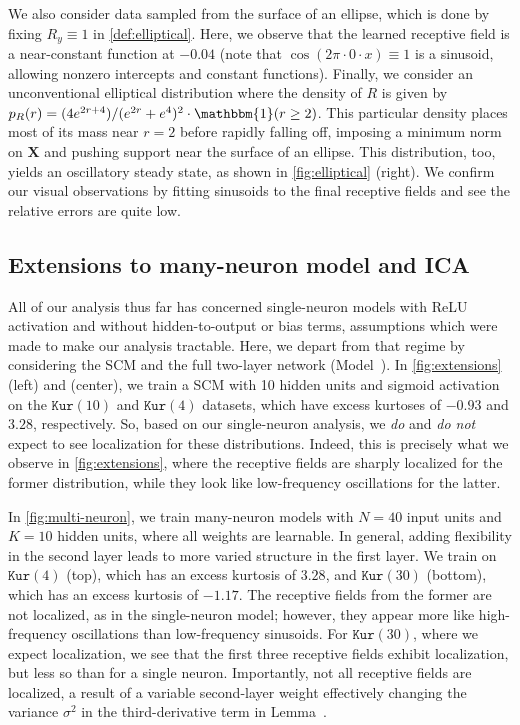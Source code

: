 We also consider data sampled from the surface of an ellipse, which is done by fixing $R_y \equiv 1$ in \cref{def:elliptical}.
Here, we observe that the learned receptive field is a near-constant function at $-0.04$ (note that $\cos(2\pi \cdot 0 \cdot x) \equiv 1$ is a sinusoid, allowing nonzero intercepts and constant functions).
Finally, we consider an unconventional elliptical distribution where the density of $R$ is given by
$p_R(r) = (4e^{2r+4}) / (e^{2r}+e^{4})^{2} \cdot \mathbbm{1}(r \geq 2)$.
This particular density places most of its mass near $r = 2$ before rapidly falling off, imposing a minimum norm on $\mathbf{X}$ and pushing support near the surface of an ellipse.
This distribution, too, yields an oscillatory steady state, as shown in \cref{fig:elliptical} (right). 
We confirm our visual observations by fitting sinusoids to the final receptive fields and see the relative errors are quite low.

\subsection{Extensions to many-neuron model and ICA}
\label{sec:extensions}

All of our analysis thus far has concerned single-neuron models with ReLU activation and without hidden-to-output or bias terms, assumptions which were made to make our analysis tractable.
Here, we depart from that regime by considering the SCM and the full two-layer network (Model~).
In \cref{fig:extensions} (left) and (center), we train a SCM with 10 hidden units and sigmoid activation on the $\texttt{Kur}(10)$ and $\texttt{Kur}(4)$ datasets, which have excess kurtoses of $-0.93$ and $3.28$, respectively.
So, based on our single-neuron analysis, we \emph{do} and \emph{do not} expect to see localization for these distributions.
Indeed, this is precisely what we observe in \cref{fig:extensions}, where the receptive fields are sharply localized for the former distribution, while they look like low-frequency oscillations for the latter.


In \cref{fig:multi-neuron}, we train many-neuron models with $N=40$ input units and $K=10$ hidden units, where all weights are learnable.
In general, adding flexibility in the second layer leads to more varied structure in the first layer.
We train on $\texttt{Kur}(4)$ (top), which has an excess kurtosis of $3.28$, and $\texttt{Kur}(30)$ (bottom), which has an excess kurtosis of $-1.17$.
The receptive fields from the former are not localized, as in the single-neuron model; however, they appear more like high-frequency oscillations than low-frequency sinusoids.
For $\texttt{Kur}(30)$, where we expect localization, we see that the first three receptive fields exhibit localization, but less so than for a single neuron.
Importantly, not all receptive fields are localized,
a result of a variable second-layer weight effectively changing the variance $\sigma^2$ in the third-derivative term in Lemma~.

